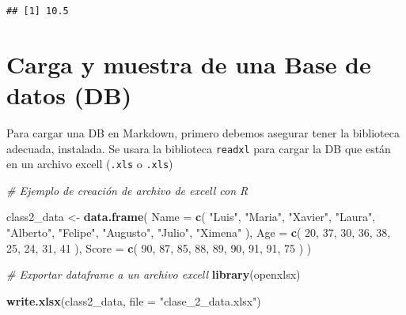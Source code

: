 \documentclass[
]{book}
\newenvironment{Shaded}{\begin{snugshade}}{\end{snugshade}}
\newcommand{\AttributeTok}[1]{\textcolor[rgb]{0.13,0.29,0.53}{#1}}
\newcommand{\CommentTok}[1]{\textcolor[rgb]{0.56,0.35,0.01}{\textit{#1}}}
\newcommand{\DecValTok}[1]{\textcolor[rgb]{0.00,0.00,0.81}{#1}}
\newcommand{\FunctionTok}[1]{\textcolor[rgb]{0.13,0.29,0.53}{\textbf{#1}}}
\newcommand{\NormalTok}[1]{#1}
\newcommand{\OtherTok}[1]{\textcolor[rgb]{0.56,0.35,0.01}{#1}}
\newcommand{\StringTok}[1]{\textcolor[rgb]{0.31,0.60,0.02}{#1}}
\theoremstyle{definition}
\theoremstyle{definition}
\theoremstyle{definition}
\theoremstyle{definition}
\theoremstyle{remark}
\begin{document}
\begin{verbatim}
## [1] 10.5
\end{verbatim}

\hypertarget{carga-y-muestra-de-una-base-de-datos-db}{%
\section*{Carga y muestra de una Base de datos (DB)}\label{carga-y-muestra-de-una-base-de-datos-db}}

Para cargar una DB en Markdown, primero debemos asegurar tener la biblioteca adecuada, instalada. Se usara la biblioteca \texttt{readxl} para cargar la DB que están en un archivo excell (\texttt{.xls} o \texttt{.xls})

\begin{Shaded}
\begin{Highlighting}[]
\CommentTok{\# Ejemplo de creación de archivo de excell con R}

\NormalTok{class2\_data }\OtherTok{\textless{}{-}} \FunctionTok{data.frame}\NormalTok{(}
  \AttributeTok{Name =} \FunctionTok{c}\NormalTok{(}
    \StringTok{"Luis"}\NormalTok{, }\StringTok{"Maria"}\NormalTok{, }\StringTok{"Xavier"}\NormalTok{, }
    \StringTok{"Laura"}\NormalTok{, }\StringTok{"Alberto"}\NormalTok{, }\StringTok{"Felipe"}\NormalTok{,}
    \StringTok{"Augusto"}\NormalTok{, }\StringTok{"Julio"}\NormalTok{, }\StringTok{"Ximena"}
\NormalTok{    ),}
  \AttributeTok{Age =} \FunctionTok{c}\NormalTok{(}
    \DecValTok{20}\NormalTok{, }\DecValTok{37}\NormalTok{, }\DecValTok{30}\NormalTok{, }\DecValTok{36}\NormalTok{, }\DecValTok{38}\NormalTok{, }\DecValTok{25}\NormalTok{, }\DecValTok{24}\NormalTok{, }\DecValTok{31}\NormalTok{, }\DecValTok{41}
\NormalTok{  ),}
  \AttributeTok{Score =} \FunctionTok{c}\NormalTok{(}
    \DecValTok{90}\NormalTok{, }\DecValTok{87}\NormalTok{, }\DecValTok{85}\NormalTok{, }\DecValTok{88}\NormalTok{, }\DecValTok{89}\NormalTok{, }\DecValTok{90}\NormalTok{, }\DecValTok{91}\NormalTok{, }\DecValTok{91}\NormalTok{, }\DecValTok{75}
\NormalTok{  )}
\NormalTok{)}

\CommentTok{\# Exportar dataframe a un archivo excell}
\FunctionTok{library}\NormalTok{(openxlsx)}

\FunctionTok{write.xlsx}\NormalTok{(class2\_data, }\AttributeTok{file =} \StringTok{"clase\_2\_data.xlsx"}\NormalTok{)}
\end{Highlighting}
\end{Shaded}
\end{document}
